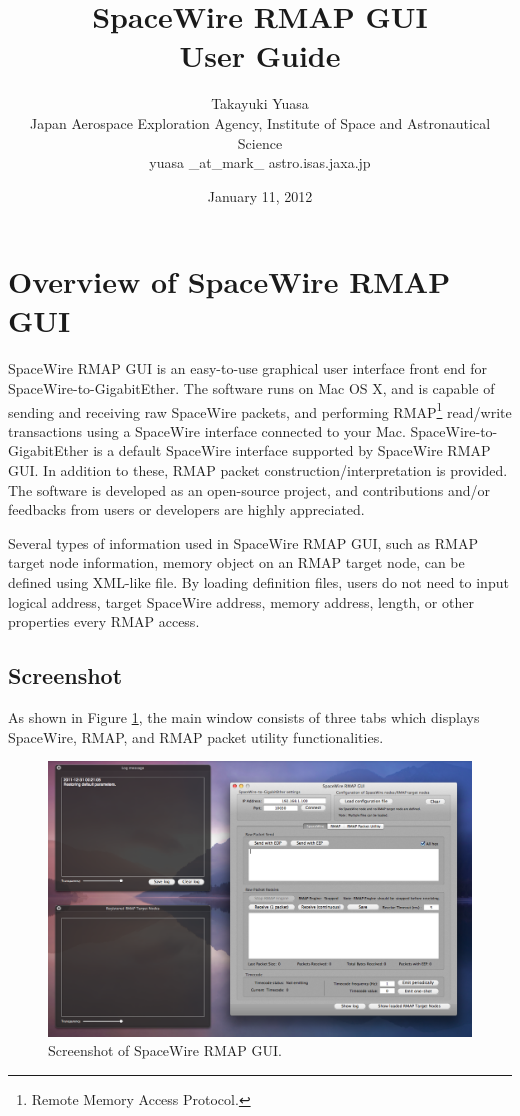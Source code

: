 \documentclass[a4paper,10pt]{article}
\title{\Huge{
SpaceWire RMAP GUI}\\
\Large{User Guide}}
\author{
{\Large
Takayuki Yuasa
}\\
{\small Japan Aerospace Exploration Agency, Institute of Space and Astronautical Science}\\
{\small yuasa \_at\_mark\_ astro.isas.jaxa.jp}\\
}
\date{January 11, 2012}
\begin{document}
\maketitle
\tableofcontents

\setcounter{page}{2}

\section{Overview of SpaceWire RMAP GUI}
SpaceWire RMAP GUI is an easy-to-use graphical user interface front end for SpaceWire-to-GigabitEther. The software runs on Mac OS X, and is capable of sending and receiving raw SpaceWire packets, and performing RMAP\footnote{Remote Memory Access Protocol.} read/write transactions using a SpaceWire interface connected to your Mac. SpaceWire-to-GigabitEther is a default SpaceWire interface supported by SpaceWire RMAP GUI. 
In addition to these, RMAP packet construction/interpretation is provided. The software is developed as an open-source project, and contributions and/or feedbacks from users or developers are highly appreciated.

Several types of information used in SpaceWire RMAP GUI, such as RMAP target node information, memory object on an RMAP target node, can be defined using XML-like file. By loading definition files, users do not need to input logical address, target SpaceWire address, memory address, length, or other properties every RMAP access.

\subsection{Screenshot}
As shown in Figure \ref{figure:tab_rmap}, the main window consists of three tabs which displays SpaceWire, RMAP, and RMAP packet utility functionalities.
\begin{figure}[htb]
\begin{center}
\includegraphics[width=15cm]{figures/SpaceWireRMAPGUI/Screenshot_all.png}
\caption{Screenshot of SpaceWire RMAP GUI.}
\label{figure:tab_rmap}
\end{center}
\end{figure}
\end{document}

